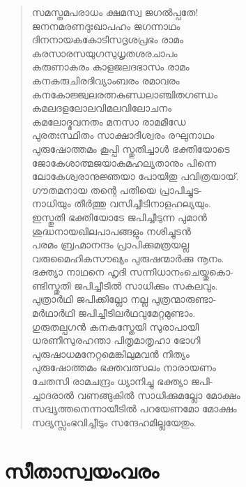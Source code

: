 \begin{verse}
സമസ്തമപരാധം ക്ഷമസ്വ ജഗല്‍പ്പതേ!\\
ജനനമരണദുഃഖാപഹം ജഗന്നാഥം\\
ദിനനായകകോടിസദൃശപ്രഭം രാമം\\
കരസാരസയുഗസുധൃതശരചാപം\\
കരുണാകരം കാളജലദഭാസം രാമം\\
കനകരുചിരദിവ്യാംബരം രമാവരം\\
കനകോജ്ജ്വലരത്നകുണ്ഡലാഞ്ചിതഗണ്ഡം\\
കമലദളലോലവിമലവിലോചനം\\
കമലോദ്ഭവനതം മനസാ രാമമീഡേ\\
പുരതഃസ്ഥിതം സാക്ഷാദീശ്വരം രഘുനാഥം\\
പുരുഷോത്തമം കൂപ്പി സ്തുതിച്ചാള്‍ ഭക്തിയോടെ\\
ജോകേശാത്മജയാകുമഹല്യതാനും പിന്നെ\\
ലോകേശ്വരാനുജ്ഞയാ പോയിതു പവിത്രയായ്.\\
ഗൗതമനായ തന്റെ പതിയെ പ്രാപിച്ചുട-\\
നാധിയും തീര്‍ത്തു വസിച്ചീടിനാളഹല്യയും.\\
ഇസ്തുതി ഭക്തിയോടേ ജപിച്ചീടുന്ന പുമാന്‍\\
ശുദ്ധനായഖിലപാപങ്ങളും നശിച്ചുടന്‍\\
പരമം ബ്രഹ്മാനന്ദം പ്രാപിക്കുമത്രയല്ല\\
വരുമൈഹികസൗഖ്യം പുരുഷന്മാര്‍ക്കു നൂനം.\\
ഭക്ത്യാ നാഥനെ ഹൃദി സന്നിധാനംചെയ്തുകൊ-\\
ണ്ടിസ്തുതി ജപിച്ചീടില്‍ സാധിക്കും സകലവും.\\
പുത്രാര്‍ഥി ജപിക്കില്ലോ നല്ല പുത്രന്മാരുണ്ടാ-\\
മര്‍ഥാര്‍ഥി ജപിച്ചീടിലര്‍ഥവുമേറ്റമുണ്ടാം.\\
ഗുരുതല്പഗന്‍ കനകസ്തേയി സുരാപായി\\
ധരണീസുരഹന്താ പിതൃമാതൃഹാ ഭോഗി\\
പുരുഷാധമനേറ്റമെങ്കിലുമവന്‍ നിത്യം\\
പുരുഷോത്തമം ഭക്തവത്സലം നാരായണം\\
ചേതസി രാമചന്ദ്രം ധ്യാനിച്ചു ഭക്ത്യാ ജപി-\\
ച്ചാദരാല്‍ വണങ്ങുകില്‍ സാധിക്കുമല്ലോ മോക്ഷം\\
സദ്വൃത്തനെന്നായീടില്‍ പറയേണമോ മോക്ഷം\\
സദ്യസ്സംഭവിച്ചീടും സന്ദേഹമില്ലയേതും.
\end{verse}


\section{സീതാസ്വയംവരം}

